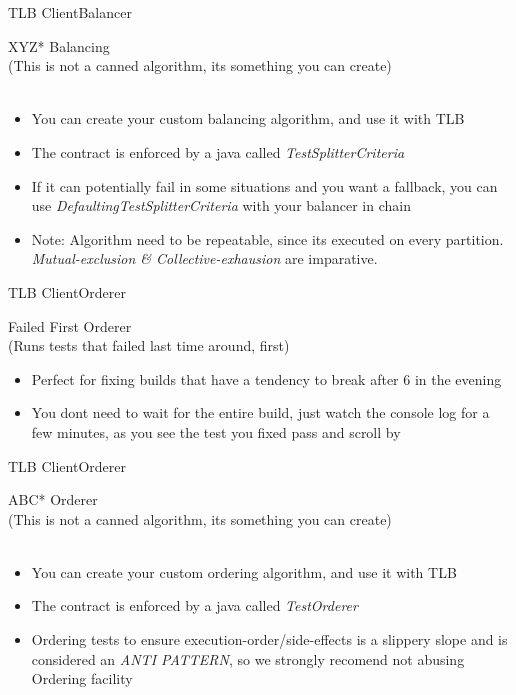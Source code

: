 \documentclass{beamer}
\begin{document}
\begin{frame}{TLB Client}{Balancer}
  \begin{center}
    {\large *XYZ* Balancing}\\
    {\tiny (This is not a canned algorithm, its something you can create)}\\
    \quad\\
    \begin{itemize}
    \item You can create your custom balancing algorithm, and use it with TLB
    \item The contract is enforced by a java  called \emph{TestSplitterCriteria}
    \item If it can potentially fail in some situations and you want a fallback, you can use \emph{DefaultingTestSplitterCriteria} with your balancer in chain
    \item Note: Algorithm need to be repeatable, since its executed on every partition. \emph{Mutual-exclusion \& Collective-exhausion} are imparative.
    \end{itemize}
  \end{center}
\end{frame}

\begin{frame}{TLB Client}{Orderer}
  \begin{center}
    {\large Failed First Orderer}\\
    {\tiny (Runs tests that failed last time around, first)}\\
    \begin{itemize}
      \item Perfect for fixing builds that have a tendency to break after 6 in the evening
      \item You dont need to wait for the entire build, just watch the console log for a few minutes, as you see the test you fixed pass and scroll by
    \end{itemize}
  \end{center}
\end{frame}

\begin{frame}{TLB Client}{Orderer}
  \begin{center}
    {\large *ABC* Orderer}\\
    {\tiny (This is not a canned algorithm, its something you can create)}\\
    \quad\\
    \begin{itemize}
    \item You can create your custom ordering algorithm, and use it with TLB
    \item The contract is enforced by a java  called \emph{TestOrderer}
    \item Ordering tests to ensure execution-order/side-effects is a slippery slope and is considered an \emph{ANTI PATTERN}, so we strongly recomend not abusing Ordering facility
    \end{itemize}
  \end{center}
\end{frame}
\end{document}
